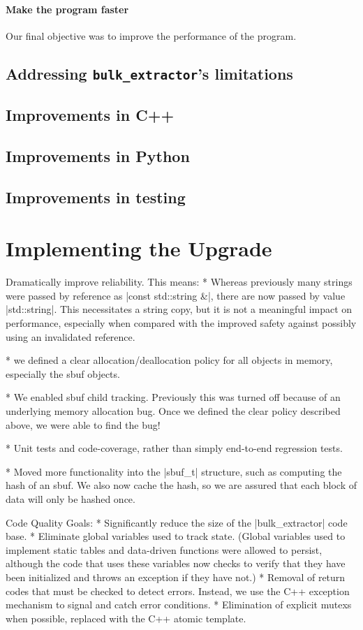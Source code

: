 \documentclass[5p]{elsarticle}
\newcommand{\be}{\texttt{bulk\_extractor}\xspace}
\begin{document}
\paragraph{Make the program faster}

Our final objective was to improve the performance of the program.


\subsection{Addressing \be's limitations}
\subsection{Improvements in C++}
\subsection{Improvements in Python}
\subsection{Improvements in testing}

\section{Implementing the Upgrade}

Dramatically improve reliability. This means:
* Whereas previously many strings were passed by reference as |const std::string &|,
there are now passed by value |std::string|. This necessitates a
string copy, but it is not a meaningful impact on performance,
especially when compared with the improved safety against possibly
using an invalidated reference.

* we defined a clear allocation/deallocation policy for all
objects in memory, especially the sbuf objects.

* We enabled sbuf child tracking. Previously this was turned off
because of an underlying memory allocation bug. Once we defined the
clear policy described above, we were able to find the bug!

* Unit tests and code-coverage, rather than simply end-to-end
regression tests.

* Moved more functionality into the |sbuf_t| structure, such as
computing the hash of an sbuf. We also now cache the hash, so we are
assured that each block of data will only be hashed once.


Code Quality Goals:
* Significantly reduce the size of the |bulk_extractor| code base.
* Eliminate global variables used to track state. (Global variables
used to implement static tables and data-driven functions were allowed
to persist, although the code that uses these variables now checks to
verify that they have been initialized and throws an exception if they
have not.)
* Removal of return codes that must be checked to detect
errors. Instead, we use the C++ exception mechanism to signal and
catch error conditions.
* Elimination of explicit mutexs when possible, replaced with the C++
atomic template.
\end{document}

